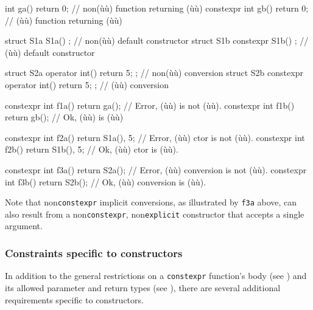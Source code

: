 \begin{emcppslisting}
          int ga() { return 0; }  // non(ù{}ù) function returning (ù{}ù)
constexpr int gb() { return 0; }  //    (ù{}ù) function returning (ù{}ù)

struct S1a {           S1a() { } };  // non(ù{}ù) default constructor
struct S1b { constexpr S1b() { } };  //    (ù{}ù) default constructor

struct S2a { operator int() { return 5; } };      // non(ù{}ù) conversion
struct S2b { constexpr operator int() { return 5; } }; // (ù{}ù) conversion

constexpr int f1a() { return ga(); }  // Error, (ù{}ù) is not (ù{}ù).
constexpr int f1b() { return gb(); }  // Ok, (ù{}ù) is (ù{}ù)

constexpr int f2a() { return S1a(), 5; }  // Error, (ù{}ù) ctor is not (ù{}ù).
constexpr int f2b() { return S1b(), 5; }  // Ok, (ù{}ù) ctor is (ù{}ù).

constexpr int f3a() { return S2a(); } // Error, (ù{}ù) conversion is not (ù{}ù).
constexpr int f3b() { return S2b(); } // Ok, (ù{}ù) conversion is (ù{}ù).
\end{emcppslisting}


\noindent Note that non\lstinline!constexpr! implicit conversions, as illustrated by
\lstinline!f3a! above, can also result from a non\lstinline!constexpr!,
non\lstinline!explicit! constructor that accepts a single argument.

\subsubsection[Constraints specific to constructors]{Constraints specific to constructors}\label{constraints-specific-to-constructors}

In addition to the general restrictions on a \lstinline!constexpr!
function's body (see ) and its allowed parameter and return
types (see ), there are several additional requirements specific to
constructors.

